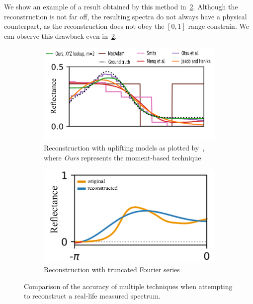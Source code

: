 We show an example of a result obtained by this method in~\cref{fig:specRecTruncatedFourier}. Although the reconstruction is not far off, the resulting spectra do not always have a physical counterpart, as the reconstruction does not obey the $[0,1]$ range constrain. We can observe this drawback even in~\cref{fig:specRecTruncatedFourier}.

\begin{figure}[t]
	\centering
	\begin{subfigure}[t]{0.45\textwidth}
	\includegraphics[width=\linewidth]{img/spectra_rec_method_comparison.png}
	\caption{Reconstruction with uplifting models as plotted by~\citet{trigonometricMomentsPaper}, where \emph{Ours} represents the moment-based technique}
	\label{fig:specRecUpliftingMethods}
	\end{subfigure} \hspace{0.1em}
	\begin{subfigure}[t]{0.45\textwidth}
	\includegraphics[width=\linewidth]{img/spectra_rec_truncated_fourier.png}
	\caption{Reconstruction with truncated Fourier series~\cite{trigonometricMomentsPresentation}}
	\label{fig:specRecTruncatedFourier}
	\end{subfigure}
	\caption{Comparison of the accuracy of multiple techniques when attempting to reconstruct a real-life measured spectrum.}
	\label{fig:spectraReconstruction}
\end{figure}

